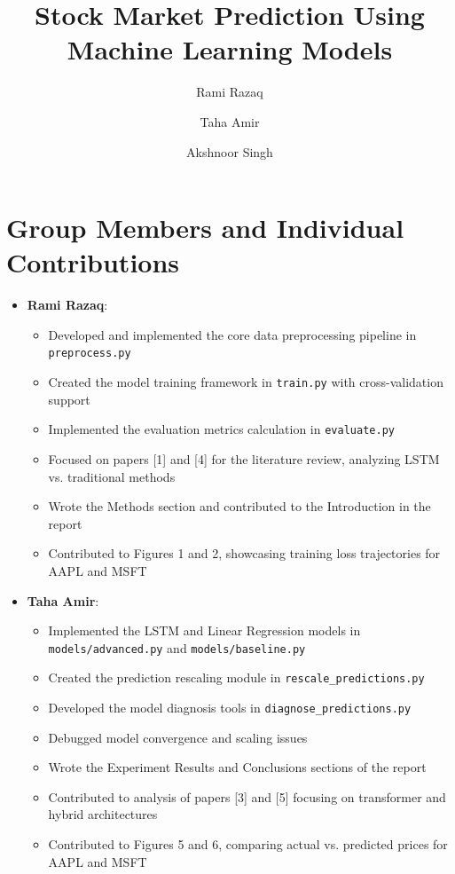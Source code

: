 \documentclass[sigconf]{acmart}
\title{Stock Market Prediction Using Machine Learning Models}
\author{Rami Razaq}
\affiliation{
  \institution{University of Example}
  \city{City}
  \country{Country}
}
\author{Taha Amir}
\affiliation{
  \institution{University of Example}
  \city{City}
  \country{Country}
}
\author{Akshnoor Singh}
\affiliation{
  \institution{University of Example}
  \city{City}
  \country{Country}
}
\begin{document}
\maketitle

\section{Group Members and Individual Contributions}

\begin{itemize}
\item \textbf{Rami Razaq}: 
  \begin{itemize}
    \item Developed and implemented the core data preprocessing pipeline in \texttt{preprocess.py}
    \item Created the model training framework in \texttt{train.py} with cross-validation support
    \item Implemented the evaluation metrics calculation in \texttt{evaluate.py}
    \item Focused on papers [1] and [4] for the literature review, analyzing LSTM vs. traditional methods
    \item Wrote the Methods section and contributed to the Introduction in the report
    \item Contributed to Figures 1 and 2, showcasing training loss trajectories for AAPL and MSFT
  \end{itemize}

\item \textbf{Taha Amir}: 
  \begin{itemize}
    \item Implemented the LSTM and Linear Regression models in \texttt{models/advanced.py} and \texttt{models/baseline.py}
    \item Created the prediction rescaling module in \texttt{rescale\_predictions.py}
    \item Developed the model diagnosis tools in \texttt{diagnose\_predictions.py}
    \item Debugged model convergence and scaling issues
    \item Wrote the Experiment Results and Conclusions sections of the report
    \item Contributed to analysis of papers [3] and [5] focusing on transformer and hybrid architectures
    \item Contributed to Figures 5 and 6, comparing actual vs. predicted prices for AAPL and MSFT
  \end{itemize}


\end{itemize}
\end{document}
